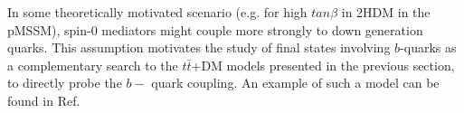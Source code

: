 

In some theoretically motivated scenario (e.g. for high $tan\beta$ in 2HDM in the pMSSM), 
spin-0 mediators might couple more strongly to down generation quarks.
This assumption motivates the study of final states involving $b$-quarks 
as a complementary search to the $t\bar
t$+DM models presented in the previous section, to directly probe the $b-$ quark coupling. 
An example of such a model can be found in Ref.~\cite{Buckley:2014fba}



